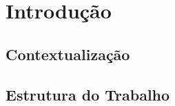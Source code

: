 \chapter{Introdução}
\label{cap:introducao}

\section{Contextualização}

\section{Estrutura do Trabalho}









